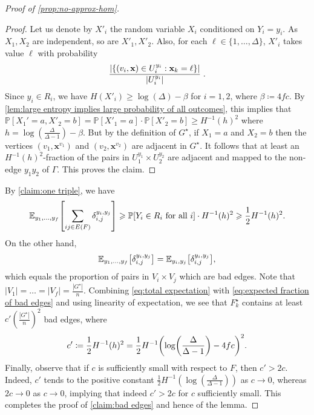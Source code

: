 \documentclass[reqno, english, 12pt]{amsart}
\theoremstyle{plain}
\theoremstyle{remark}
\newcommand{\bx}{\mathbf{x}}
\DeclarePairedDelimiter{\abs}{\lvert}{\rvert}
\renewcommand{\geq}{\geqslant}
\newcommand{\Prob}{\mathbb{P}}
\let\originalleft\left
\let\originalright\right
\renewcommand{\left}{\mathopen{}\mathclose\bgroup\originalleft}
\renewcommand{\right}{\aftergroup\egroup\originalright}
\begin{document}
\begin{proof}[Proof of \cref{prop:no-approx-hom}]
\begin{proof}
		Let us denote by $X'_i$ the random variable $X_i$ conditioned on $Y_i = y_i$.
		As $X_1,X_2$ are independent, so are $X'_1,X'_2$.
		Also, for each $\ell \in \{1,\dots,\Delta\}$, $X'_i$ takes value $\ell$ with probability 
		$$
		\frac{\abs{\{(v_i,\bx) \in U_i^{y_i} : \bx_k = \ell\}}}{\abs{U_i^{y_i}}} \; .$$ 
		Since $y_i \in R_i$, we have $H(X'_i) \geq \log(\Delta) - \beta$ for $i=1,2$, where $\beta \coloneqq 4fc$. By \cref{lem:large entropy implies large probability of all outcomes}, this implies that 
		$\Prob [ X_1'=a,X'_2=b] = \Prob[X'_1=a] \cdot \Prob[X'_2=b] \geq H^{-1} (h)^2$ where $h = \log(\frac{\Delta}{\Delta-1}) - \beta$.
		But by the definition of $G^{\star}$, if $X_1=a$ and $X_2=b$ then the vertices $(v_1,\bx^{v_1})$ and $(v_2,\bx^{v_2})$ are adjacent in $G^{\star}$. 
		It follows that at least an $H^{-1}(h)^2$-fraction of the pairs in $U_1^{y_1} \times U_2^{y_2}$ are adjacent and mapped to the non-edge $y_1y_2$ of $\Gamma$. This proves the claim.
	\end{proof}

	By \cref{claim:one triple}, we have
	\begin{equation}\label{eq:expected fraction of bad edges}
	\mathbb{E}_{y_1,\dots,y_f} 
	\left[ \sum_{ij \in E(F)} \delta_{i,j}^{y_i,y_j} \right] \geq 
	\mathbb{P}[ Y_i \in R_i\text{ for all }i] \cdot H^{-1}(h)^2 \geq 
	\frac{1}{2}H^{-1}(h)^2.
	\end{equation}
	On the other hand,
	\begin{equation}\label{eq:total expectation}
	\mathbb{E}_{y_1,\dots,y_f}\left[ \delta_{i,j}^{y_i,y_j} \right] = \mathbb{E}_{y_i,y_j}\left[ \delta_{i,j}^{y_i,y_j} \right],
	\end{equation}
	which equals the proportion of pairs in $V_i \times V_j$ which are bad edges. 
	Note that $|V_1| = \dots = |V_f| = \frac{|G^{\star}|}{n}$. 
	Combining \eqref{eq:total expectation} with \eqref{eq:expected fraction of bad edges} and using linearity of expectation, 
	we see that $F_k^{\star}$ contains at least 
	$c'( \frac{|G^{\star}|}{n} )^2$ bad edges, where
	$$c' \coloneqq \frac{1}{2}H^{-1}(h)^2 = \frac{1}{2}H^{-1}\left( \log\left(\frac{\Delta}{\Delta-1}\right) - 4fc\right)^2.$$
	Finally, observe that if $c$ is sufficiently small with respect to $F$, then $c' > 2c$. Indeed, $c'$ tends to the positive constant $\frac 12 H^{-1}(\log(\frac{\Delta}{\Delta-1}))$ as $c\to 0$, whereas $2c \to 0$ as $c \to 0$, implying that indeed $c'>2c$ for $c$ sufficiently small.
	This completes the proof of \cref{claim:bad edges} and hence of the lemma. 
	\end{proof}
\end{document}
